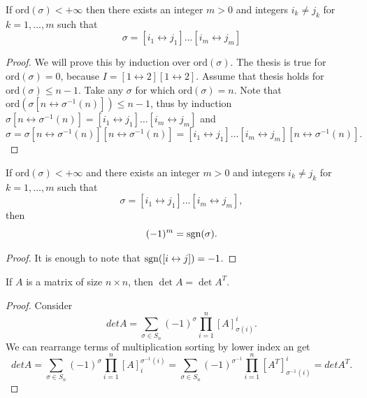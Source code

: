 \documentclass[main.tex]{subfiles}
\begin{document}
\begin{theorem}
If $\text{ord}(\sigma) < +\infty$ then there exists an integer $m > 0$ and integers $i_k\not=j_k$ for $k=1, \dots, m$ such that
\begin{equation}
\sigma = [i_1\leftrightarrow j_1] \dots [i_m\leftrightarrow j_m]
\end{equation}
\end{theorem}
\begin{proof}
We will prove this by induction over $\text{ord}(\sigma)$. The thesis is true for $\text{ord}(\sigma)=0$, because $I = [1 \leftrightarrow 2][1 \leftrightarrow 2]$. Assume that thesis holds for $\text{ord}(\sigma) \leq n - 1$. Take any $\sigma$ for which $\text{ord}(\sigma) = n$. Note that $\text{ord}(\sigma[n\leftrightarrow \sigma^{-1}(n)]) \leq n-1$, thus by induction $\sigma[n\leftrightarrow \sigma^{-1}(n)] = [i_1\leftrightarrow j_1] \dots [i_m\leftrightarrow j_m]$ and
\begin{equation}
\sigma = \sigma[n\leftrightarrow \sigma^{-1}(n)][n\leftrightarrow \sigma^{-1}(n)] 
= [i_1\leftrightarrow j_1] \dots [i_m\leftrightarrow j_m][n\leftrightarrow \sigma^{-1}(n)].
\end{equation}
\end{proof}

\begin{theorem}
If $\text{ord}(\sigma) < +\infty$ and there exists an integer $m > 0$ and integers $i_k\not=j_k$ for $k=1, \dots, m$ such that
\begin{equation}
\sigma = [i_1\leftrightarrow j_1] \dots [i_m\leftrightarrow j_m],
\end{equation}
then 
\begin{equation}
(-1)^m = \text{sgn}(\sigma).
\end{equation}
\end{theorem}
\begin{proof}
It is enough to note that $\text{sgn}([i\leftrightarrow j]) = -1$.
\end{proof}

\begin{theorem}
If $A$ is a matrix of size $n\times n$, then $\det A = \det A^T$.
\end{theorem}
\begin{proof}
Consider
\begin{equation}
det A = \sum\limits_{\sigma\in S_n} (-1)^\sigma \prod_{i=1}^n [A]^i_{\sigma(i)}.
\end{equation}
We can rearrange terms of multiplication sorting by lower index an get
\begin{equation}
det A = \sum\limits_{\sigma\in S_n} (-1)^\sigma \prod_{i=1}^n [A]^{\sigma^{-1}(i)}_i = 
\sum\limits_{\sigma\in S_n} (-1)^{\sigma^{-1}} \prod_{i=1}^n 
[A^T]^i_{\sigma^{-1}(i)} = det A^T.
\end{equation}
\end{proof}
\end{document}
